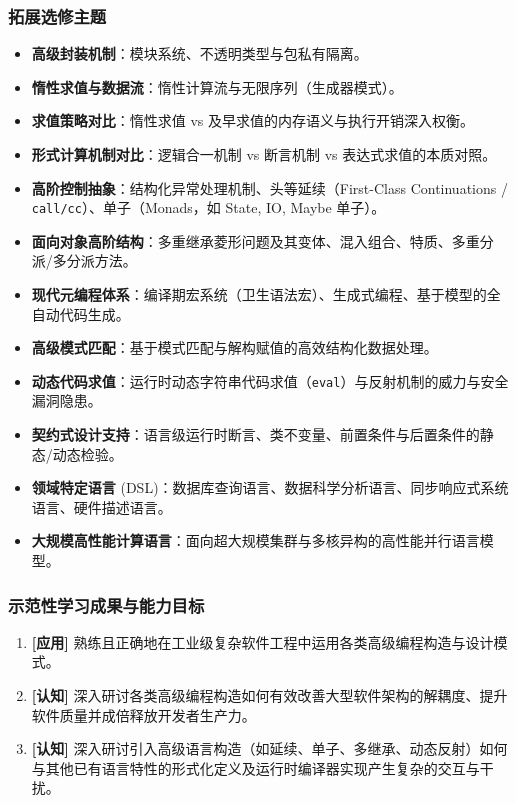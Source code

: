 \subsubsection{拓展选修主题}
\begin{itemize}
    \item \textbf{高级封装机制}：模块系统、不透明类型与包私有隔离。
    \item \textbf{惰性求值与数据流}：惰性计算流与无限序列（生成器模式）。
    \item \textbf{求值策略对比}：惰性求值 vs 及早求值的内存语义与执行开销深入权衡。
    \item \textbf{形式计算机制对比}：逻辑合一机制 vs 断言机制 vs 表达式求值的本质对照。
    \item \textbf{高阶控制抽象}：结构化异常处理机制、头等延续（First-Class Continuations / \texttt{call/cc}）、单子（Monads，如 State, IO, Maybe 单子）。
    \item \textbf{面向对象高阶结构}：多重继承菱形问题及其变体、混入组合、特质、多重分派/多分派方法。
    \item \textbf{现代元编程体系}：编译期宏系统（卫生语法宏）、生成式编程、基于模型的全自动代码生成。
    \item \textbf{高级模式匹配}：基于模式匹配与解构赋值的高效结构化数据处理。
    \item \textbf{动态代码求值}：运行时动态字符串代码求值（\texttt{eval}）与反射机制的威力与安全漏洞隐患。
    \item \textbf{契约式设计支持}：语言级运行时断言、类不变量、前置条件与后置条件的静态/动态检验。
    \item \textbf{领域特定语言} (DSL)：数据库查询语言、数据科学分析语言、同步响应式系统语言、硬件描述语言。
    \item \textbf{大规模高性能计算语言}：面向超大规模集群与多核异构的高性能并行语言模型。
\end{itemize}

\subsubsection{示范性学习成果与能力目标}
\begin{enumerate}
    \item \textbf{[应用]} 熟练且正确地在工业级复杂软件工程中运用各类高级编程构造与设计模式。
    \item \textbf{[认知]} 深入研讨各类高级编程构造如何有效改善大型软件架构的解耦度、提升软件质量并成倍释放开发者生产力。
    \item \textbf{[认知]} 深入研讨引入高级语言构造（如延续、单子、多继承、动态反射）如何与其他已有语言特性的形式化定义及运行时编译器实现产生复杂的交互与干扰。
\end{enumerate}

